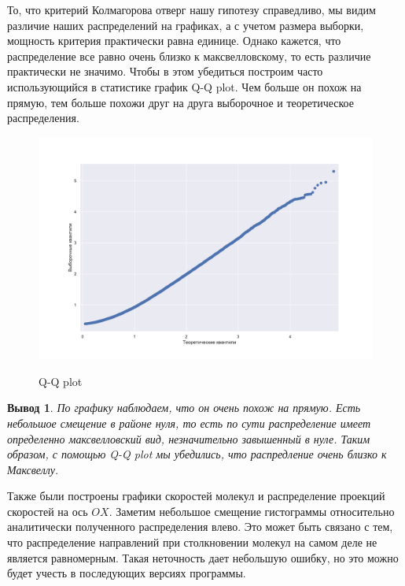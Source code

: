 \documentclass[twoside,twocolumn, 11pt]{article}
\theoremstyle{plain}
\newtheorem{conclusion}{Вывод}
\theoremstyle{definition}
\begin{document}
\indent То, что критерий Колмагорова отверг нашу гипотезу справедливо, мы видим различие наших распределений на графиках, а с учетом размера выборки, мощность критерия практически равна единице.
Однако кажется, что распределение все равно очень близко к максвелловскому, то есть различие практически не значимо. Чтобы в этом убедиться построим часто использующийся в статистике график Q-Q plot. Чем больше он похож на прямую, тем больше похожи друг на друга выборочное и теоретическое распределения.
\begin{figure}[!h]
{\includegraphics[width=1\linewidth]{qqplot}}
\caption{Q-Q plot}
\end{figure}


\begin{conclusion}
По графику наблюдаем, что он очень похож на прямую. Есть небольшое смещение в районе нуля, то есть по сути распределение имеет определенно максвелловский вид, незначительно завышенный в нуле.
Таким образом, с помощью Q-Q plot мы убедились, что распредление очень близко к Максвеллу.
\end{conclusion}

Также были построены графики скоростей молекул и распределение проекций скоростей на ось $OX$. Заметим небольшое смещение гистограммы относительно аналитически полученного распределения влево. Это может быть связано с тем, что распределение направлений при столкновении молекул на самом деле не является равномерным. Такая неточность дает небольшую ошибку, но это можно будет учесть в последующих версиях программы.
\end{document}
